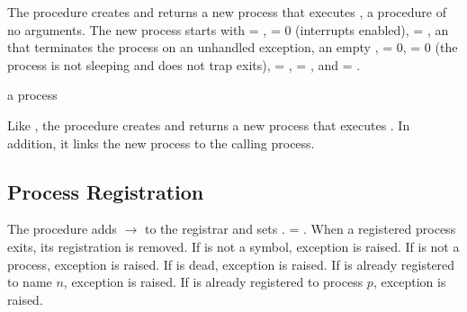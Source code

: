 The  procedure creates and returns a new process that
executes , a procedure of no arguments. The new process
starts with  = ,  = 0 (interrupts
enabled),  = \code{()}, an 
that terminates the process on an unhandled exception, an empty
,  = 0,  = 0 (the
process is not sleeping and does not trap exits),  =
\code{()},  = \code{()}, and  =
.

\begin{procedure}
\end{procedure}
\returns{} a process

Like , the  procedure creates and
returns a new process that executes . In addition, it links
the new process to the calling process.

\subsection {Process Registration}

\begin{procedure}
\end{procedure}
\returns{} 

The  procedure adds  $\rightarrow$
 to the registrar and sets . =
. When a registered process exits, its registration is
removed. If  is not a symbol, exception  is raised. If  is not a process,
exception  is raised. If
 is dead, exception 
is raised. If  is already registered to name $n$,
exception  is raised. If
 is already registered to process $p$, exception
 is raised.

\begin{procedure}
\end{procedure}
\returns{} 

